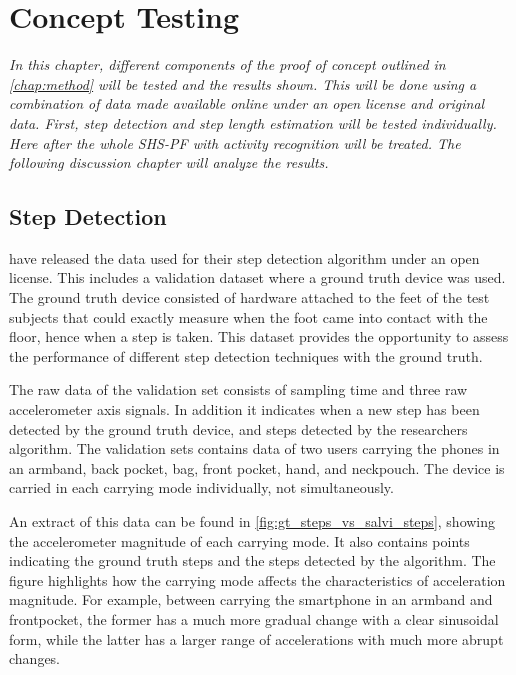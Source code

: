 \chapter{Concept Testing}

\textit{In this chapter, different components of the proof of concept outlined in \cref{chap:method} will be tested and the results shown. This will be done using a combination of data made available online under an open license and original data. First, step detection and step length estimation will be tested individually. Here after the whole SHS-PF with activity recognition will be treated. The following discussion chapter will analyze the results.}

\section{Step Detection}
\citet{Salvi2018} have released the data used for their step detection algorithm under an open license. This includes a validation dataset where a ground truth device was used. The ground truth device consisted of hardware attached to the feet of the test subjects that could exactly measure when the foot came into contact with the floor, hence when a step is taken. This dataset provides the opportunity to assess the performance of different step detection techniques with the ground truth.\par

The raw data of the validation set consists of sampling time and three raw accelerometer axis signals. In addition it indicates when a new step has been detected by the ground truth device, and steps detected by the researchers algorithm. The validation sets contains data of two users carrying the phones in an armband, back pocket, bag, front pocket, hand, and neckpouch. The device is carried in each carrying mode individually, not simultaneously.\par

An extract of this data can be found in \cref{fig:gt_steps_vs_salvi_steps}, showing the accelerometer magnitude of each carrying mode. It also contains points indicating the ground truth steps and the steps detected by the \citet{Salvi2018} algorithm. The figure highlights how the carrying mode affects the characteristics of acceleration magnitude. For example, between carrying the smartphone in an armband and frontpocket, the former has a much more gradual change with a clear sinusoidal form, while the latter has a larger range of accelerations with much more abrupt changes. 

